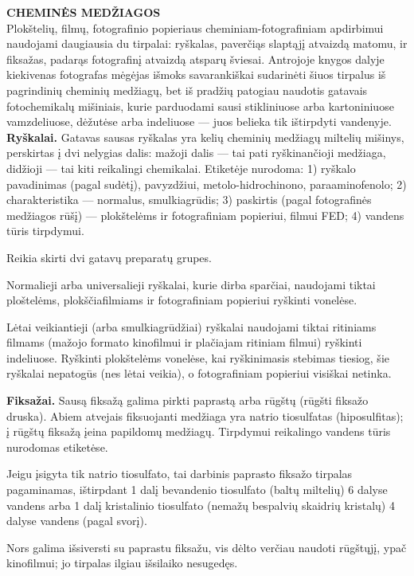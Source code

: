 \documentclass[12pt]{book}
\begin{document}
				\textbf{CHEMINĖS MEDŽIAGOS}\\
				Plokštelių, filmų, fotografinio popieriaus cheminiam-fotografiniam apdirbimui naudojami daugiausia du tirpalai: ryškalas, paverčiąs slaptąjį atvaizdą matomu, ir fiksažas, padarąs fotografinį atvaizdą atsparų šviesai. Antrojoje knygos dalyje kiekivenas fotografas mėgėjas išmoks savarankiškai sudarinėti šiuos tirpalus iš pagrindinių cheminių medžiagų, bet iš pradžių patogiau naudotis gatavais fotochemikalų mišiniais, kurie parduodami sausi stikliniuose arba kartoniniuose vamzdeliuose, dėžutėse arba indeliuose --- juos belieka tik ištirpdyti vandenyje.\\

				\textbf{Ryškalai.} Gatavas sausas ryškalas yra kelių cheminių medžiagų miltelių mišinys, perskirtas į dvi nelygias dalis: mažoji dalis --- tai pati ryškinančioji medžiaga, didžioji --- tai kiti reikalingi chemikalai. Etiketėje nurodoma: 1) ryškalo pavadinimas (pagal sudėtį), pavyzdžiui, metolo-hidrochinono, paraaminofenolo; 2) charakteristika --- normalus, smulkiagrūdis; 3) paskirtis (pagal fotografinės medžiagos rūšį) --- plokštelėms ir fotografiniam popieriui, filmui FED; 4) vandens tūris tirpdymui.

				Reikia skirti dvi gatavų preparatų grupes.

				Normalieji arba universalieji ryškalai, kurie dirba sparčiai, naudojami tiktai ploštelėms, plokščiafilmiams ir fotografiniam popieriui ryškinti vonelėse.

				Lėtai veikiantieji (arba smulkiagrūdžiai) ryškalai naudojami tiktai ritiniams filmams (mažojo formato kinofilmui ir plačiajam ritiniam filmui) ryškinti indeliuose. Ryškinti plokštelėms vonelėse, kai ryškinimasis stebimas tiesiog, šie ryškalai nepatogūs (nes lėtai veikia), o fotografiniam popieriui visiškai netinka.

				\textbf{Fiksažai.} Sausą fiksažą galima pirkti paprastą arba rūgštų (rūgšti fiksažo druska). Abiem atvejais fiksuojanti medžiaga yra natrio tiosulfatas (hiposulfitas); į rūgštų fiksažą įeina papildomų medžiagų. Tirpdymui reikalingo vandens tūris nurodomas etiketėse.

				Jeigu įsigyta tik natrio tiosulfato, tai darbinis paprasto fiksažo tirpalas pagaminamas, ištirpdant 1 dalį bevandenio tiosulfato (baltų miltelių) 6 dalyse vandens arba 1 dalį kristalinio tiosulfato (nemažų bespalvių skaidrių kristalų) 4 dalyse vandens (pagal svorį).

				Nors galima išsiversti su paprastu fiksažu, vis dėlto verčiau naudoti rūgštųjį, ypač kinofilmui; jo tirpalas ilgiau išsilaiko nesugedęs.
\end{document}
